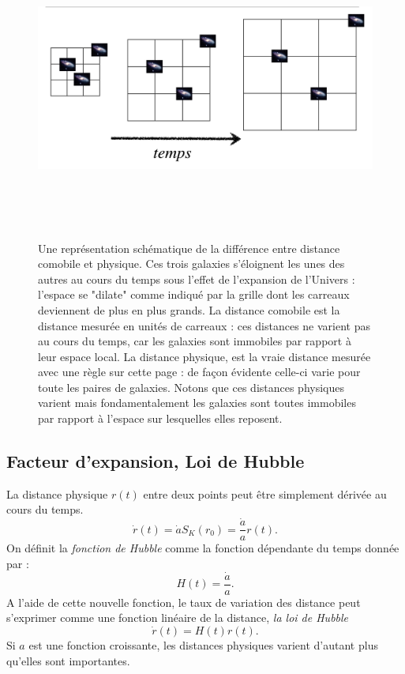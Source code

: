 \begin{figure}[htbp]
	\centering
		\includegraphics[height=10cm]{figs/grille.png}
	\caption[Coordonnées comobiles et expansion]{Une représentation schématique de la différence entre distance comobile et physique. Ces trois galaxies s'éloignent les unes des autres au cours du temps sous l'effet de l'expansion de l'Univers : l'espace se "dilate" comme indiqué par la grille dont les carreaux deviennent de plus en plus grands. La distance comobile est la distance mesurée en unités de carreaux : ces distances ne varient pas au cours du temps, car les galaxies sont immobiles par rapport à leur espace local. La distance physique, est la vraie distance mesurée avec une règle sur cette page : de façon évidente celle-ci varie pour toute les paires de galaxies. Notons que ces distances physiques varient mais fondamentalement les galaxies sont toutes immobiles par rapport à l'espace sur lesquelles elles reposent.}
	\label{f:grille}
\end{figure}

\subsection{Facteur d'expansion, Loi de Hubble}
La distance physique $r(t)$ entre deux points peut être simplement dérivée au cours du temps.
\begin{equation}
\dot r(t)= \dot a S_K(r_0) =\frac{\dot a}{a}r(t).
\end{equation}
On définit la \textit{fonction de Hubble} comme la fonction dépendante du temps donnée par :
\begin{equation}
H(t)=\frac{\dot a}{a}.
\label{e:hubble}
\end{equation}
A l'aide de cette nouvelle fonction, le taux de variation des distance peut s'exprimer comme une fonction linéaire de la distance, \textit{la loi de Hubble}
\begin{equation}
\dot r(t) = H(t) r(t).
\label{e:hubble2}
\end{equation}
Si $a$ est une fonction croissante, les distances physiques varient d'autant plus qu'elles sont importantes.

